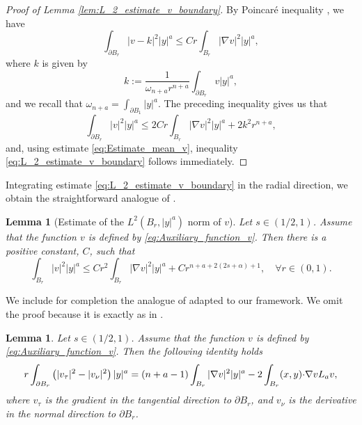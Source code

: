 \documentclass[11pt,reqno]{amsart}
\newtheorem{lem}[thm]{Lemma}
\theoremstyle{definition}
\theoremstyle{remark}
\begin{document}
\begin{proof}[Proof of Lemma \ref{lem:L_2_estimate_v_boundary}]
By Poincar\'e inequality \cite[Lemma 2.10]{Caffarelli_Salsa_Silvestre_2008}, we have
$$
\int_{\partial B_r} |v-k|^2 |y|^a \leq C r\int_{B_r} |\nabla v|^2|y|^a,
$$
where $k$ is given by
$$
k:=\frac{1}{\omega_{n+a}r^{n+a}}\int_{\partial B_r} v|y|^a,
$$
and we recall that $\omega_{n+a}=\int_{\partial B_1} |y|^a$. The preceding inequality gives us that
$$
\int_{\partial B_r} |v|^2 |y|^a \leq 2 C r\int_{B_r}|\nabla v|^2 |y|^a + 2 k^2 r^{n+a},
$$
and, using estimate \eqref{eq:Estimate_mean_v}, inequality \eqref{eq:L_2_estimate_v_boundary} follows immediately.
\end{proof}

Integrating estimate \eqref{eq:L_2_estimate_v_boundary} in the radial direction, we obtain the straightforward analogue of \cite[Corollary 2.15]{Caffarelli_Salsa_Silvestre_2008}. 

\begin{lem}[Estimate of the $L^2(B_r, |y|^a)$ norm of $v$]
\label{lem:L_2_estimate_v}
Let $s\in (1/2,1)$. Assume that the function $v$ is defined by \eqref{eq:Auxiliary_function_v}. Then there is a positive constant, $C$, such that
\begin{equation}
\label{eq:L_2_estimate_v}
\int_{B_r} |v|^2 |y|^a \leq C r^2\int_{B_r}|\nabla v|^2 |y|^a + Cr^{n+a+2(2s+\alpha)+1},\quad\forall r\in (0,1).
\end{equation}
\end{lem}

We include for completion the analogue of \cite[Lemma 7.8]{Caffarelli_Salsa_Silvestre_2008} adapted to our framework. We omit the proof because it is exactly as in \cite{Caffarelli_Salsa_Silvestre_2008}.

\begin{lem}
\label{lem:Gradient_estimate}
Let $s\in (1/2,1)$. Assume that the function $v$ is defined by \eqref{eq:Auxiliary_function_v}. Then the following identity holds
\begin{equation}
\label{eq:Gradient_estimate}
r\int_{\partial B_r} \left(|v_{\tau}|^2-|v_{\nu}|^2\right)|y|^a 
= (n+a-1) \int_{B_r} |\nabla v|^2|y|^a  -2\int_{B_r} (x,y){\hbox{$\cdot$}} \nabla v L_a v,
\end{equation}
where $v_{\tau}$ is the gradient in the tangential direction to $\partial B_r$, and $v_{\nu}$ is the derivative in the normal direction to $\partial B_r$.
\end{lem}
\end{document}

